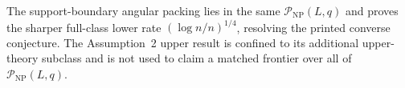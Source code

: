 The support-boundary angular packing lies in the same \(\mathcal P_{\mathrm{NP}}(L,q)\) and proves the sharper full-class lower rate \((\log n/n)^{1/4}\), resolving the printed converse conjecture.  The Assumption~2 upper result is confined to its additional upper-theory subclass and is not used to claim a matched frontier over all of \(\mathcal P_{\mathrm{NP}}(L,q)\).